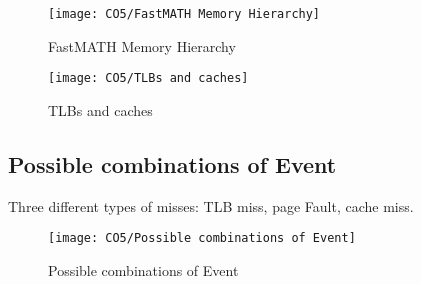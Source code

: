 \begin{figure}[!htb]
    \centering
    \texttt{[image: CO5/FastMATH Memory Hierarchy]}
    \caption{FastMATH Memory Hierarchy}
\end{figure}

\begin{figure}[!htb]
    \centering
    \texttt{[image: CO5/TLBs and caches]}
    \caption{TLBs and caches}
\end{figure}


\subsection{Possible combinations of Event}
Three different types of misses: TLB miss, page Fault, cache miss. 
\begin{figure}[!htb]
    \centering
    \texttt{[image: CO5/Possible combinations of Event]}
    \caption{Possible combinations of Event}
\end{figure}
